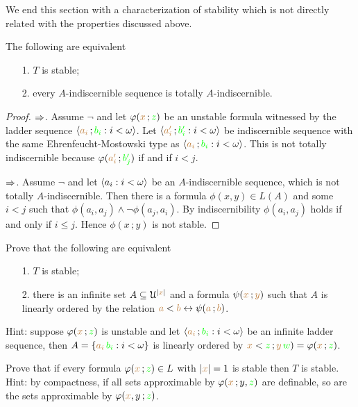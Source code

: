 \documentclass[creche.tex]{subfiles}
\begin{document}
We end this section with a characterization of stability which is not directly related with the properties discussed above. 

\begin{proposition} The following are equivalent
\begin{itemize}
\item[1.] $T$ is stable;
\item[2.] every $A$-indiscernible sequence is totally $A$-indiscernible.
\end{itemize}
\end{proposition}

\begin{proof}
$\Rightarrow$. Assume $\neg$ and let $\varphi({\color{brown} x}\,;{\color{green} z})$ be an unstable formula witnessed by the ladder sequence $\langle{\color{brown}a_i}\,;{\color{green} b_i}:i<\omega\rangle$. Let $\langle{\color{brown}a'_i}\,;{\color{green} b'_i} : i<\omega\rangle$ be 
indiscernible sequence with the same Ehren\-feucht-Mostowski type as $\langle{\color{brown}a_i}\,;{\color{green} b_i} : i<\omega\rangle$. This is not totally indiscernible because $\varphi({\color{brown} a'_i}\,;{\color{green} b'_j})$ if and if $i< j$.

$\Rightarrow$. Assume $\neg$ and let $\langle a_i : i<\omega\rangle$ be an $A$-indiscernible sequence, which is not totally $A$-in\-dis\-cern\-ible. Then there is a formula $\phi(x, y)\in L(A)$ and some $i<j$ such that $\phi(a_i , a_j )\wedge\neg\phi(a_j , a_i) $. By indiscernibility  $\phi(a_i, a_j)$ holds if and only if $i\le j$. Hence $\phi(x\,; y)$ is not stable.
\end{proof}

\begin{exercise}\label{ex_stable_orderproperty}
Prove that the following are equivalent
\begin{itemize}
\item[1.] $T$ is stable;
\item[2.] there is an infinite set $A\subseteq\EuScript U^{|{\color{brown} x}|}$ and a formula  $\psi({\color{brown} x}\,;{\color{brown} y})$ such that $A$ is linearly ordered by the relation ${\color{brown} a}<{\color{brown} b}\leftrightarrow\psi({\color{brown} a}\,;{\color{brown} b})$.
\end{itemize}
Hint: suppose $\varphi({\color{brown} x}\,;{\color{green} z})$ is unstable and let $\langle{\color{brown}a_i}\,;{\color{green} b_i} : i<\omega\rangle$ be an infinite ladder sequence, then $A=\{{\color{brown} a_i}\,{\color{green} b_i} : i<\omega\}$ is linearly ordered by ${\color{brown} x}<{\color{green} z}\,;{\color{brown} y}\,{\color{green} w})=\varphi({\color{brown} x}\,;{\color{green} z})$.\QED
\end{exercise}


\begin{exercise}
Prove that if every formula $\varphi({\color{brown} x}\,;{\color{green} z})\in L$ with $|{\color{brown} x}|=1$ is stable then $T$ is stable. Hint: by compactness, if all sets approximable by $\varphi({\color{brown} x}\,;y,{\color{green} z})$ are definable, so are the sets approximable by $\varphi({\color{brown} x},y\,;{\color{green} z})$.\QED
\end{exercise}
\end{document}
